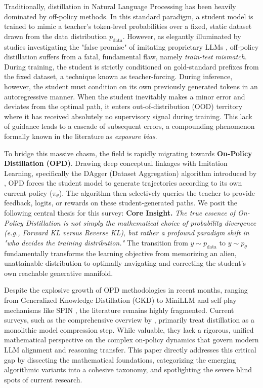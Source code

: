 \documentclass{article} %
\newcommand{\ptheta}{p_\theta}
\newcommand{\pdata}{p_{\mathrm{data}}}
\begin{document}
Traditionally, distillation in Natural Language Processing has been heavily dominated by off-policy methods. In this standard paradigm, a student model is trained to mimic a teacher's token-level probabilities over a fixed, static dataset drawn from the data distribution $\pdata$. However, as elegantly illuminated by studies investigating the "false promise" of imitating proprietary LLMs \citep{2305.15717}, off-policy distillation suffers from a fatal, fundamental flaw, namely \textit{train-test mismatch}. During training, the student is strictly conditioned on gold-standard prefixes from the fixed dataset, a technique known as teacher-forcing. During inference, however, the student must condition on its own previously generated tokens in an autoregressive manner. When the student inevitably makes a minor error and deviates from the optimal path, it enters out-of-distribution (OOD) territory where it has received absolutely no supervisory signal during training. This lack of guidance leads to a cascade of subsequent errors, a compounding phenomenon formally known in the literature as \textit{exposure bias}. 

To bridge this massive chasm, the field is rapidly migrating towards \textbf{On-Policy Distillation (OPD)}. Drawing deep conceptual linkages with Imitation Learning, specifically the DAgger (Dataset Aggregation) algorithm introduced by \citet{ross2011reduction}, OPD forces the student model to generate trajectories according to its own current policy ($\pi_\theta$). The algorithm then selectively queries the teacher to provide feedback, logits, or rewards on these student-generated paths. We posit the following central thesis for this survey:
\textbf{Core Insight.} \textit{The true essence of On-Policy Distillation is not simply the mathematical choice of probability divergence (e.g., Forward KL versus Reverse KL), but rather a profound paradigm shift in "who decides the training distribution."} The transition from $y \sim \pdata$ to $y \sim \ptheta$ fundamentally transforms the learning objective from memorizing an alien, unattainable distribution to optimally navigating and correcting the student's own reachable generative manifold.

Despite the explosive growth of OPD methodologies in recent months, ranging from Generalized Knowledge Distillation (GKD) \citep{2306.13649} to MiniLLM \citep{2306.08543} and self-play mechanisms like SPIN \citep{2401.01335}, the literature remains highly fragmented. Current surveys, such as the comprehensive overview by \citet{2402.13116}, primarily treat distillation as a monolithic model compression step. While valuable, they lack a rigorous, unified mathematical perspective on the complex on-policy dynamics that govern modern LLM alignment and reasoning transfer. This paper directly addresses this critical gap by dissecting the mathematical foundations, categorizing the emerging algorithmic variants into a cohesive taxonomy, and spotlighting the severe blind spots of current research.
\end{document}
